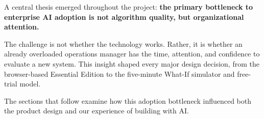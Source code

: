 A central thesis emerged throughout the project: \textbf{the primary bottleneck to enterprise AI adoption is not algorithm quality, but organizational attention.}

The challenge is not whether the technology works. Rather, it is whether an already overloaded operations manager has the time, attention, and confidence to evaluate a new system. This insight shaped every major design decision, from the browser-based Essential Edition to the five-minute What-If simulator and free-trial model.

The sections that follow examine how this adoption bottleneck influenced both the product design and our experience of building with AI.



